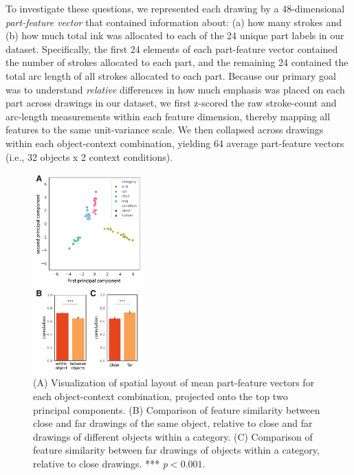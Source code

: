 \documentclass[10pt,letterpaper]{article}
\newcommand{\kushin}[1]{{\color{orange}{[kushin: #1]}}}
\begin{document}
To investigate these questions, we represented each drawing by a 48-dimensional \textit{part-feature vector} that contained information about: (a) how many strokes and (b) how much total ink was allocated to each of the 24 unique part labels in our dataset. 
Specifically, the first 24 elements of each part-feature vector contained the number of strokes allocated to each part, and the remaining 24 contained the total arc length of all strokes allocated to each part. 
Because our primary goal was to understand \textit{relative} differences in how much emphasis was placed on each part across drawings in our dataset, we first z-scored the raw stroke-count and arc-length measurements within each feature dimension, thereby mapping all features to the same unit-variance scale. 
We then collapsed across drawings within each object-context combination, yielding 64 average part-feature vectors (i.e., 32 objects x 2 context conditions). 

\begin{figure}[ht]
\centering
\includegraphics[width=0.38\textwidth]{figures/7_part_emphasis.pdf}
\caption{(A) Visualization of spatial layout of mean part-feature vectors for each object-context combination, projected onto the top two principal components. (B) Comparison of feature similarity between close and far drawings of the same object, relative to close and far drawings of different objects within a category. (C) Comparison of feature similarity between far drawings of objects within a category, relative to close drawings. *** \textit{p}$<0.001.$}
\label{part_emphasis}
\end{figure}
\end{document}
